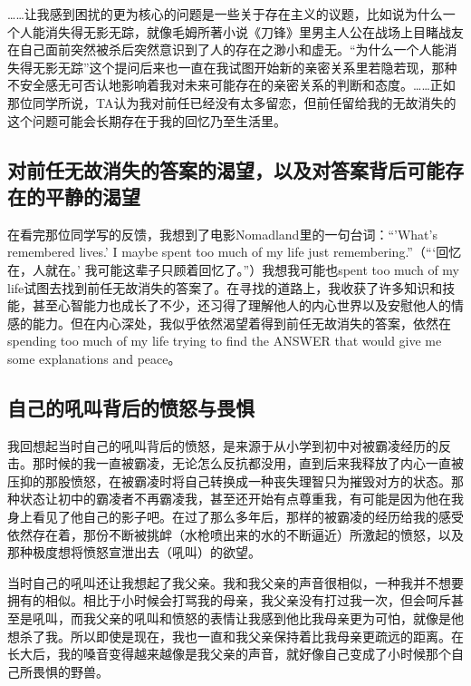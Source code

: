 ……让我感到困扰的更为核心的问题是一些关于存在主义的议题，比如说为什么一个人能消失得无影无踪，就像毛姆所著小说《刀锋》里男主人公在战场上目睹战友在自己面前突然被杀后突然意识到了人的存在之渺小和虚无。“为什么一个人能消失得无影无踪”这个提问后来也一直在我试图开始新的亲密关系里若隐若现，那种不安全感无可否认地影响着我对未来可能存在的亲密关系的判断和态度。……正如那位同学所说，TA认为我对前任已经没有太多留恋，但前任留给我的无故消失的这个问题可能会长期存在于我的回忆乃至生活里。




\subsection*{对前任无故消失的答案的渴望，以及对答案背后可能存在的平静的渴望}

在看完那位同学写的反馈，我想到了电影Nomadland里的一句台词：“'What's remembered lives.' I maybe spent too much of my life just remembering.”（“‘回忆在，人就在。’ 我可能这辈子只顾着回忆了。”）我想我可能也spent too much of my life试图去找到前任无故消失的答案了。在寻找的道路上，我收获了许多知识和技能，甚至心智能力也成长了不少，还习得了理解他人的内心世界以及安慰他人的情感的能力。但在内心深处，我似乎依然渴望着得到前任无故消失的答案，依然在spending too much of my life trying to find the ANSWER that would give me some explanations and peace。




\subsection*{自己的吼叫背后的愤怒与畏惧}

我回想起当时自己的吼叫背后的愤怒，是来源于从小学到初中对被霸凌经历的反击。那时候的我一直被霸凌，无论怎么反抗都没用，直到后来我释放了内心一直被压抑的那股愤怒，在被霸凌时将自己转换成一种丧失理智只为摧毁对方的状态。那种状态让初中的霸凌者不再霸凌我，甚至还开始有点尊重我，有可能是因为他在我身上看见了他自己的影子吧。在过了那么多年后，那样的被霸凌的经历给我的感受依然存在着，那份不断被挑衅（水枪喷出来的水的不断逼近）所激起的愤怒，以及那种极度想将愤怒宣泄出去（吼叫）的欲望。

当时自己的吼叫还让我想起了我父亲。我和我父亲的声音很相似，一种我并不想要拥有的相似。相比于小时候会打骂我的母亲，我父亲没有打过我一次，但会呵斥甚至是吼叫，而我父亲的吼叫和愤怒的表情让我感到他比我母亲更为可怕，就像是他想杀了我。所以即使是现在，我也一直和我父亲保持着比我母亲更疏远的距离。在长大后，我的嗓音变得越来越像是我父亲的声音，就好像自己变成了小时候那个自己所畏惧的野兽。

